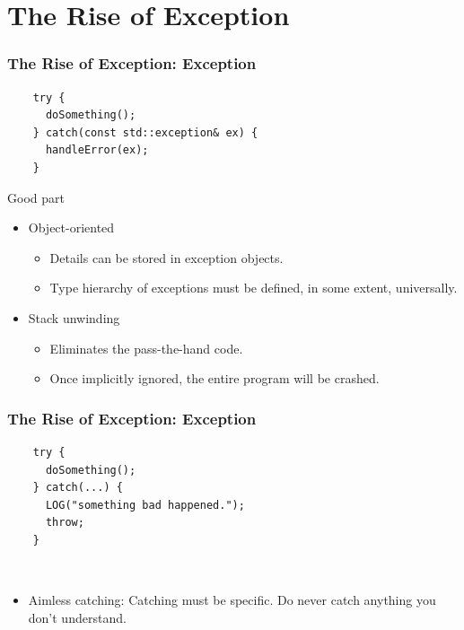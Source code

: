 \documentclass[lualatex]{beamer}
\begin{document}
\section{The Rise of Exception}

\begin{frame}[fragile]
  \frametitle{The Rise of Exception: Exception}

  \begin{verbatim}
    try {
      doSomething();
    } catch(const std::exception& ex) {
      handleError(ex);
    }
  \end{verbatim}

  \begin{block}{Good part}
    \begin{itemize}
    \item Object-oriented
      \begin{itemize}
      \item Details can be stored in exception objects.
      \item Type hierarchy of exceptions must be defined, in some extent, universally.
      \end{itemize}
    \item Stack unwinding
      \begin{itemize}
      \item Eliminates the pass-the-hand code.
      \item Once implicitly ignored, the entire program will be crashed.
      \end{itemize}
    \end{itemize}
  \end{block}
\end{frame}

\begin{frame}[fragile]
  \frametitle{The Rise of Exception: Exception}

  \begin{verbatim}
    try {
      doSomething();
    } catch(...) {
      LOG("something bad happened.");
      throw;
    }
  \end{verbatim}

  \begin{alertblock}{~}
    \begin{itemize}
    \item Aimless catching: Catching must be specific. Do never catch anything you don't understand.
    \end{itemize}
  \end{alertblock}
\end{frame}
\end{document}
